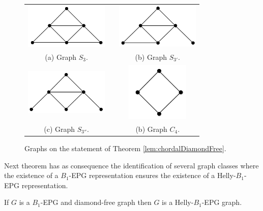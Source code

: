 \documentclass{dmgt}
\begin{document}
%
\begin{figure}[h]
  \centering
  \begin{tabular}{  c p{0.7cm} c }
    \centering
    \includegraphics[width=4cm]{s3.png} & &
    \includegraphics[width=4cm]{s3-1.png}
    \\
    \footnotesize \centering 
    (a)  \footnotesize Graph $S_3$. &&  \footnotesize (b) Graph $S_{3'}$. \\
    
      \centering 
      \includegraphics[width=4cm]{s3-2.png} & &
    \includegraphics[width=3cm]{c4.png}
    \\
    \footnotesize \centering 
    (c)  \footnotesize Graph $S_{3''}$. && \footnotesize (b) Graph $C_{4}$.\\
  \end{tabular}

 \caption{Graphs on the statement of Theorem \ref{lem:chordalDiamondFree}.}
 \label{fig:proibidos}
\end{figure} 



Next theorem has as consequence the identification of several graph classes where the existence of a $B_1$-EPG representation ensures the existence of a Helly-$B_1$-EPG representation.


\begin{theorem} \label{lem:b1DiamondFree}
 If $G$ is a $B_1$-EPG and diamond-free graph then $G$ is a Helly-$B_1$-EPG graph.
 \end{theorem}
\end{document}
